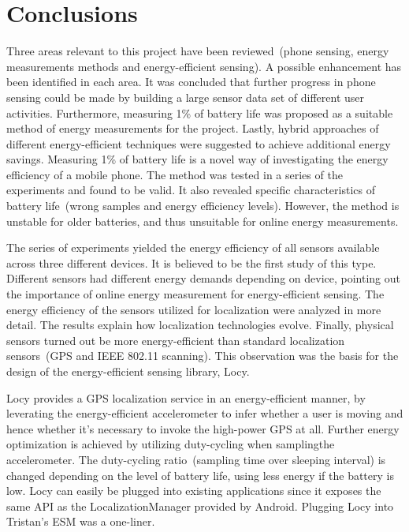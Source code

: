 \section{Conclusions}
\label{s:conc}
\hspace{10pt}Three areas relevant to this project have been reviewed\ (phone sensing, energy measurements methods and energy-efficient sensing). A possible enhancement has been identified in each area. It was concluded that further progress in phone sensing could be made by building a large sensor data set of different user activities. Furthermore, measuring 1\% of battery life was proposed as a suitable method of energy measurements for the project. Lastly, hybrid approaches of different energy-efficient techniques were suggested to achieve additional energy savings. 
Measuring 1\% of battery life is a novel way of investigating the energy efficiency of a mobile phone. The method was tested in a series of the experiments and found to be valid. It also revealed specific characteristics of battery life\ (wrong samples and energy efficiency levels). However, the method is unstable for older batteries, and thus unsuitable for online energy measurements. 		

The series of experiments yielded the energy efficiency of all sensors available across three different devices. It is believed to be the first study of this type. Different sensors had different energy demands depending on device, pointing out the importance of online energy measurement for energy-efficient sensing. The energy efficiency of the sensors utilized for localization were analyzed in more detail. The results explain how localization technologies evolve. Finally, physical sensors turned out be more energy-efficient than standard localization sensors\ (GPS and IEEE 802.11 scanning). This observation was the basis for the design of the energy-efficient sensing library, Locy.

Locy provides a GPS localization service in an energy-efficient manner, by leverating the energy-efficient accelerometer to infer whether a user is moving and hence whether it's necessary to invoke the high-power GPS at all. Further energy optimization is achieved by utilizing duty-cycling when samplingthe accelerometer. The duty-cycling ratio\ (sampling time over sleeping interval) is changed depending on the level of battery life, using less energy if the battery is low. Locy can easily be plugged into existing applications since it exposes the same API as the LocalizationManager provided by Android. Plugging Locy into Tristan's ESM was a one-liner.

